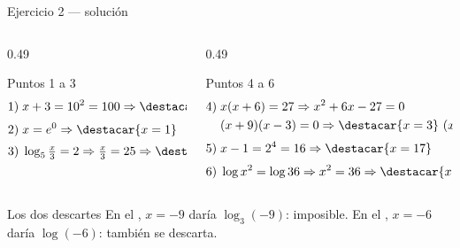 \documentclass[aspectratio=169,10pt]{beamer}
\begin{document}
\begin{frame}{Ejercicio 2 — solución}
  \tiny
  \begin{columns}[T,onlytextwidth]
    \begin{column}{0.49\textwidth}
      \begin{block}{Puntos 1 a 3}
        \tiny
        \begin{align*}
          1)\;& x+3 = 10^{2} = 100 \Rightarrow \destacar{x = 97} \\[0.25em]
          2)\;& x = e^{0} \Rightarrow \destacar{x = 1} \\[0.25em]
          3)\;& \log_{5}\tfrac{x}{3} = 2 \Rightarrow \tfrac{x}{3} = 25
                \Rightarrow \destacar{x = 75}
        \end{align*}
      \end{block}
    \end{column}
    \begin{column}{0.49\textwidth}
      \begin{block}{Puntos 4 a 6}
        \tiny
        \begin{align*}
          4)\;& x(x+6) = 27 \Rightarrow x^{2}+6x-27 = 0 \\
              & (x+9)(x-3)=0 \Rightarrow \destacar{x=3} \ (x=-9 \text{ se
                descarta}) \\[0.25em]
          5)\;& x-1 = 2^{4} = 16 \Rightarrow \destacar{x = 17} \\[0.25em]
          6)\;& \log x^{2} = \log 36 \Rightarrow x^{2}=36
                \Rightarrow \destacar{x = 6}
        \end{align*}
      \end{block}
    \end{column}
  \end{columns}

  \vspace{0.08cm}
  \begin{alertblock}{Los dos descartes}
    \tiny
    En el , $x=-9$ daría $\log_3(-9)$: imposible. \quad
    En el , $x=-6$ daría $\log(-6)$: también se descarta.
  \end{alertblock}
\end{frame}

\end{document}
